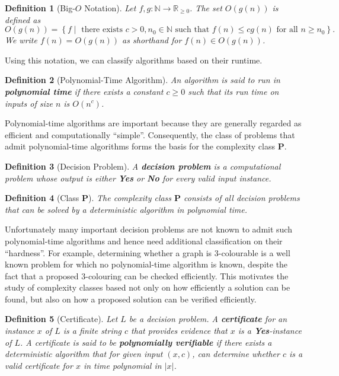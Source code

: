 \documentclass[11pt]{report}
\newtheorem{definition}{Definition}[section]
\begin{document}
\begin{definition}[Big-$O$ Notation] \label{def::big_O_notation}
  Let $f,g:\mathbb{N} \rightarrow \mathbb{R}_{\geq 0}$. The set $O(g(n))$ is defined as
  \[
  O(g(n)) = \left\{ f \mid \text{ there exists } c > 0, n_0 \in \mathbb{N} \text{ such that } f(n) \leq c g(n) \text{ for all } n \geq n_0 \right\}.
  \]
  We write $f(n)=O(g(n))$ as shorthand for $f(n)\in O(g(n))$.
\end{definition}

Using this notation, we can classify algorithms based on their runtime.

\begin{definition}[Polynomial-Time Algorithm] \label{def::polynomial_time_algorithm}
  An algorithm is said to run in \textbf{polynomial time} if there exists a constant $c \ge 0$ such that its run time on inputs of size $n$ is $O(n^c)$.
\end{definition}

Polynomial-time algorithms are important because they are generally regarded as efficient and computationally ``simple''. Consequently, the class of problems that admit polynomial-time algorithms forms the basis for the complexity class $\mathbf{P}$. 

\begin{definition}[Decision Problem] \label{def::decision_problem}
  A \textbf{decision problem} is a computational problem whose output is either \textbf{Yes} or \textbf{No} for every valid input instance. 
\end{definition}

\begin{definition}[Class $\mathbf{P}$] \label{def::class_p}
  The complexity class $\mathbf{P}$ consists of all decision problems that can be solved by a deterministic algorithm in polynomial time.
\end{definition}

Unfortunately many important decision problems are not known to admit such polynomial-time algorithms and hence need additional classification on their ``hardness''. For example, determining whether a graph is $3$-colourable is a well known problem for which no polynomial-time algorithm is known, despite the fact that a proposed $3$-colouring can be checked efficiently. This motivates the study of complexity classes based not only on how efficiently a solution can be found, but also on how a proposed solution can be verified efficiently.

\begin{definition}[Certificate] \label{def::certificate}
  Let $L$ be a decision problem. A \textbf{certificate} for an instance $x$ of $L$ is a finite string $c$ that provides evidence that $x$ is a \textbf{Yes}-instance of $L$. A certificate is said to be \textbf{polynomially verifiable} if there exists a deterministic algorithm that for given input $(x,c)$, can determine whether $c$ is a valid certificate for $x$ in time polynomial in $|x|$.
\end{definition}
\end{document}
